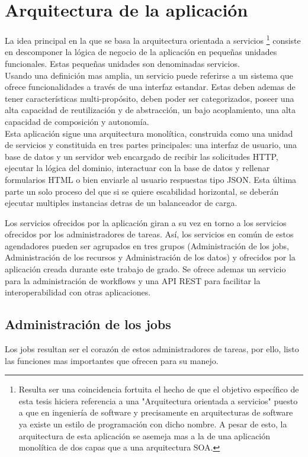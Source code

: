 \section{Arquitectura de la aplicación}
La idea principal en la que se basa la arquitectura orientada a servicios \footnote{Resulta ser una coincidencia fortuita el hecho de que el objetivo específico de esta tesis hiciera referencia a una "Arquitectura orientada a servicios" puesto a que en ingeniería de software y precisamente en arquitecturas de software ya existe un estilo de programación con dicho nombre. A pesar de esto, la arquitectura de esta aplicación se asemeja mas a la de una aplicación monolítica de dos capas que a una arquitectura SOA.} consiste en descomponer la lógica de negocio de la aplicación en pequeñas unidades funcionales. Estas pequeñas unidades son denominadas servicios.\\

Usando una definición mas amplia, un servicio puede referirse a un sistema que ofrece funcionalidades a través de una interfaz estandar. Estas deben ademas de tener características multi-propósito, deben poder ser categorizados, poseer una alta capacidad de reutilización y de abstracción, un bajo acoplamiento, una alta capacidad de composición y autonomía.\\

Esta aplicación sigue una arquitectura monolítica, construida como una unidad de servicios y constituida en tres partes principales: una interfaz de usuario, una base de datos y un servidor web encargado de recibir las solicitudes HTTP, ejecutar la lógica del dominio, interactuar con la base de datos y rellenar formularios HTML o bien enviarle al usuario respuestas tipo JSON. Esta última parte un solo proceso del que si se quiere escabilidad horizontal, se deberán ejecutar multiples instancias detras de un balanceador de carga.

Los servicios ofrecidos por la aplicación giran a su vez en torno a los servicios ofrecidos por los administradores de tareas. Así, los servicios en común de estos agendadores pueden ser agrupados en tres grupos (Administración de los jobs, Administración de los recursos y Administración de los datos) y ofrecidos por la aplicación creada durante este trabajo de grado. Se ofrece ademas un servicio para la administración de workflows y una API REST para facilitar la interoperabilidad con otras aplicaciones. \\

\subsection{Administración de los jobs}
Los jobs resultan ser el corazón de estos administradores de tareas, por ello, listo las funciones mas importantes que ofrecen para su manejo.

